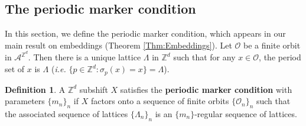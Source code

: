 \documentclass[12pt]{amsart}
\theoremstyle{definition}
\newtheorem{definition}[theorem]{Definition}
\begin{document}
\subsection{The periodic marker condition}

In this section, we define the periodic marker condition, which appears in our main result on embeddings (Theorem \ref{Thm:Embeddings}).
Let $\mathcal{O}$ be a finite orbit in $\mathcal{A}^{\mathbb{Z}^d}$. Then there is a unique lattice $\Lambda$ in $\mathbb{Z}^d$ such that for any $x \in \mathcal{O}$, the period set of $x$ is $\Lambda$ (\textit{i.e.} $\{ p \in \mathbb{Z}^d : \sigma_p(x) = x \} = \Lambda$). 

\begin{definition}
A $\mathbb{Z}^d$ subshift $X$ satisfies the \textbf{periodic marker condition} with parameters $\{m_n\}_n$ if $X$ factors onto a sequence of finite orbits $\{\mathcal{O}_n\}_n$ such that the associated sequence of lattices $\{\Lambda_n\}_n$ is an $\{m_n\}$-regular sequence of lattices.
\end{definition}
\end{document}
